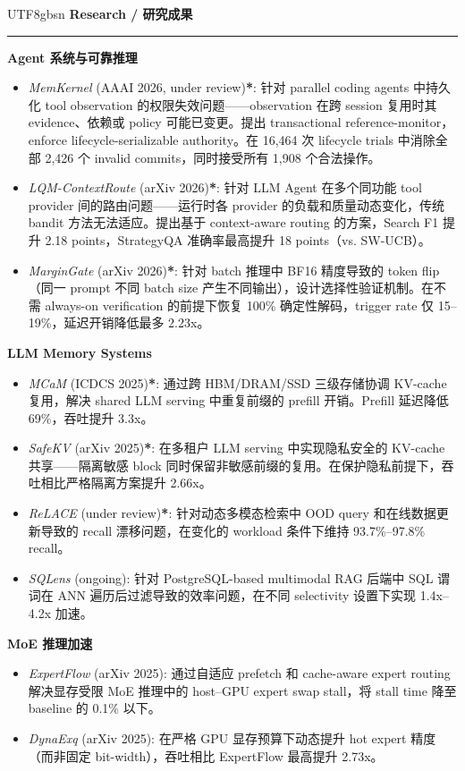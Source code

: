 \documentclass[]{resume}
\renewenvironment{rSection}[1]{%
  \vspace{0.5em}%
  \textbf{#1}%
  \vspace{0.16em}%
  \hrule
  \vspace{0.25em}%
  \begin{list}{}{%
    \setlength{\leftmargin}{0.85em}%
    \setlength{\rightmargin}{0em}%
    \setlength{\itemsep}{0pt}%
    \setlength{\topsep}{0pt}%
    \setlength{\parsep}{0pt}%
    \setlength{\partopsep}{0pt}%
  }%
  \item[]%
}{%
  \end{list}%
  \vspace{-0.28em}%
}
\begin{document}
\begin{CJK}{UTF8}{gbsn}
\begingroup
\fontsize{9.85pt}{11.2pt}\selectfont
\begin{rSection}{Research / 研究成果}

\textbf{Agent 系统与可靠推理}
\begin{itemize}
    \item \textit{MemKernel} (AAAI 2026, under review)\textbf{*}: 针对 parallel coding agents 中持久化 tool observation 的权限失效问题——observation 在跨 session 复用时其 evidence、依赖或 policy 可能已变更。提出 transactional reference-monitor，enforce lifecycle-serializable authority。在 16,464 次 lifecycle trials 中消除全部 2,426 个 invalid commits，同时接受所有 1,908 个合法操作。
    \item \textit{LQM-ContextRoute} (arXiv 2026)\textbf{*}: 针对 LLM Agent 在多个同功能 tool provider 间的路由问题——运行时各 provider 的负载和质量动态变化，传统 bandit 方法无法适应。提出基于 context-aware routing 的方案，Search F1 提升 2.18 points，StrategyQA 准确率最高提升 18 points（vs. SW-UCB）。
    \item \textit{MarginGate} (arXiv 2026)\textbf{*}: 针对 batch 推理中 BF16 精度导致的 token flip（同一 prompt 不同 batch size 产生不同输出），设计选择性验证机制。在不需 always-on verification 的前提下恢复 100\% 确定性解码，trigger rate 仅 15--19\%，延迟开销降低最多 2.23x。
\end{itemize}

\textbf{LLM Memory Systems}
\begin{itemize}
    \item \textit{MCaM} (ICDCS 2025)\textbf{*}: 通过跨 HBM/DRAM/SSD 三级存储协调 KV-cache 复用，解决 shared LLM serving 中重复前缀的 prefill 开销。Prefill 延迟降低 69\%，吞吐提升 3.3x。
    \item \textit{SafeKV} (arXiv 2025)\textbf{*}: 在多租户 LLM serving 中实现隐私安全的 KV-cache 共享——隔离敏感 block 同时保留非敏感前缀的复用。在保护隐私前提下，吞吐相比严格隔离方案提升 2.66x。
    \item \textit{ReLACE} (under review)\textbf{*}: 针对动态多模态检索中 OOD query 和在线数据更新导致的 recall 漂移问题，在变化的 workload 条件下维持 93.7\%--97.8\% recall。
    \item \textit{SQLens} (ongoing): 针对 PostgreSQL-based multimodal RAG 后端中 SQL 谓词在 ANN 遍历后过滤导致的效率问题，在不同 selectivity 设置下实现 1.4x--4.2x 加速。
\end{itemize}

\textbf{MoE 推理加速}
\begin{itemize}
    \item \textit{ExpertFlow} (arXiv 2025): 通过自适应 prefetch 和 cache-aware expert routing 解决显存受限 MoE 推理中的 host--GPU expert swap stall，将 stall time 降至 baseline 的 0.1\% 以下。
    \item \textit{DynaExq} (arXiv 2025): 在严格 GPU 显存预算下动态提升 hot expert 精度（而非固定 bit-width），吞吐相比 ExpertFlow 最高提升 2.73x。
\end{itemize}
\end{rSection}
\endgroup


\end{CJK}
\end{document}
